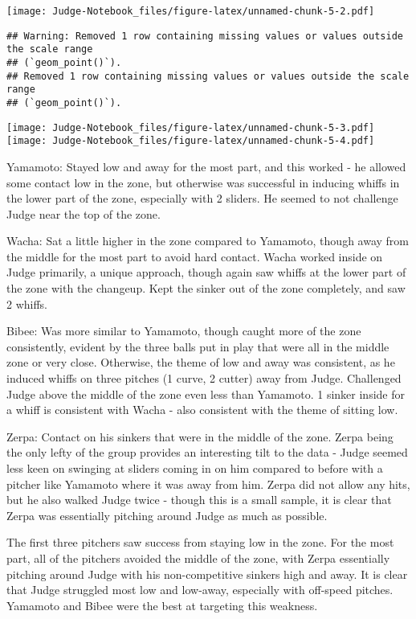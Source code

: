 \documentclass[
]{article}
\begin{document}
\texttt{[image: Judge-Notebook\_files/figure-latex/unnamed-chunk-5-2.pdf]}

\begin{verbatim}
## Warning: Removed 1 row containing missing values or values outside the scale range
## (`geom_point()`).
## Removed 1 row containing missing values or values outside the scale range
## (`geom_point()`).
\end{verbatim}

\texttt{[image: Judge-Notebook\_files/figure-latex/unnamed-chunk-5-3.pdf]}
\texttt{[image: Judge-Notebook\_files/figure-latex/unnamed-chunk-5-4.pdf]}

Yamamoto: Stayed low and away for the most part, and this worked - he
allowed some contact low in the zone, but otherwise was successful in
inducing whiffs in the lower part of the zone, especially with 2
sliders. He seemed to not challenge Judge near the top of the zone.

Wacha: Sat a little higher in the zone compared to Yamamoto, though away
from the middle for the most part to avoid hard contact. Wacha worked
inside on Judge primarily, a unique approach, though again saw whiffs at
the lower part of the zone with the changeup. Kept the sinker out of the
zone completely, and saw 2 whiffs.

Bibee: Was more similar to Yamamoto, though caught more of the zone
consistently, evident by the three balls put in play that were all in
the middle zone or very close. Otherwise, the theme of low and away was
consistent, as he induced whiffs on three pitches (1 curve, 2 cutter)
away from Judge. Challenged Judge above the middle of the zone even less
than Yamamoto. 1 sinker inside for a whiff is consistent with Wacha -
also consistent with the theme of sitting low.

Zerpa: Contact on his sinkers that were in the middle of the zone. Zerpa
being the only lefty of the group provides an interesting tilt to the
data - Judge seemed less keen on swinging at sliders coming in on him
compared to before with a pitcher like Yamamoto where it was away from
him. Zerpa did not allow any hits, but he also walked Judge twice -
though this is a small sample, it is clear that Zerpa was essentially
pitching around Judge as much as possible.

The first three pitchers saw success from staying low in the zone. For
the most part, all of the pitchers avoided the middle of the zone, with
Zerpa essentially pitching around Judge with his non-competitive sinkers
high and away. It is clear that Judge struggled most low and low-away,
especially with off-speed pitches. Yamamoto and Bibee were the best at
targeting this weakness.
\end{document}
